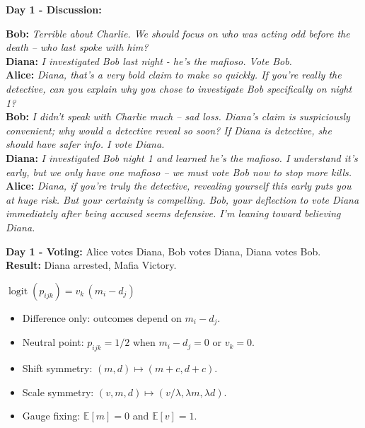 \documentclass[final]{article}
\newcommand{\sectionTitle}[1]{%
  \vspace{0.082in}{\fontsize{22.7}{26.5}\selectfont\bfseries\color{ciaamDark}#1}\par
  \vspace{0.03in}{\color{ciaamSecondary}\rule{\linewidth}{3pt}}\vspace{0.052in}}
\newcommand{\panel}[1]{%
  \noindent\colorbox{ciaamPaler}{%
    \begin{minipage}{\dimexpr\linewidth-2\fboxsep\relax}
      #1
    \end{minipage}}\par\vspace{0.098in}}
\begin{document}
\begin{minipage}[t]{0.322\linewidth}
{  \begin{posterDialogueBox}
    \textbf{Day 1 - Discussion:}\par\vspace{0.045in}
    \textbf{Bob:} \textit{Terrible about Charlie. We should focus on who was acting odd before the death -- who last spoke with him?}\\
    \textbf{Diana:} \textit{I investigated Bob last night - he's the mafioso. Vote Bob.}\\
    \textbf{Alice:} \textit{Diana, that's a very bold claim to make so quickly. If you're really the detective, can you explain why you chose to investigate Bob specifically on night 1?}\\
    \textbf{Bob:} \textit{I didn't speak with Charlie much -- sad loss. Diana's claim is suspiciously convenient; why would a detective reveal so soon? If Diana is detective, she should have safer info. I vote Diana.}\\
    \textbf{Diana:} \textit{I investigated Bob night 1 and learned he's the mafioso. I understand it's early, but we only have one mafioso -- we must vote Bob now to stop more kills.}\\
    \textbf{Alice:} \textit{Diana, if you're truly the detective, revealing yourself this early puts you at huge risk. But your certainty is compelling. Bob, your deflection to vote Diana immediately after being accused seems defensive. I'm leaning toward believing Diana.}
  \end{posterDialogueBox}

  \begin{posterResultBox}
    \textbf{Day 1 - Voting:} Alice votes Diana, Bob votes Diana, Diana votes Bob.\\
    \textbf{Result:} Diana arrested, Mafia Victory.
  \end{posterResultBox}
}

\sectionTitle{A Closed-Form Interaction Model}
\panel{%
  \begin{center}
  \colorbox{ciaamPale}{\parbox{0.88\linewidth}{
    \centering
    \vspace{0.10in}
    {\fontsize{26}{31}\selectfont\color{ciaamDark}
      $\operatorname{logit}(p_{ijk}) = v_k\,(m_i-d_j)$}
    \vspace{0.09in}
  }}
  \end{center}

  \begin{itemize}[leftmargin=0.22in,itemsep=0.04in,topsep=0.02in]
    \item Difference only: outcomes depend on $m_i-d_j$.
    \item Neutral point: $p_{ijk}=1/2$ when $m_i-d_j=0$ or $v_k=0$.
    \item Shift symmetry: $(m,d)\mapsto(m+c,d+c)$.
    \item Scale symmetry: $(v,m,d)\mapsto(v/\lambda,\lambda m,\lambda d)$.
    \item Gauge fixing: $\mathbb{E}[m]=0$ and $\mathbb{E}[v]=1$.
  \end{itemize}
}

\end{minipage}\hfill%
\end{document}
